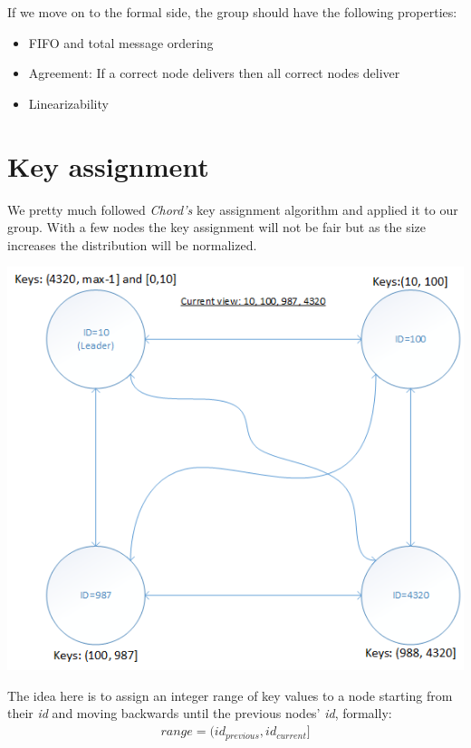 \documentclass[a4paper, 11pt]{article}
\begin{document}
\noindent If we move on to the formal side, the group should have the following properties\cite{chordy}\cite{groupy}:
\begin{itemize}
	\item FIFO and total message ordering
	\item Agreement: If a correct node delivers then all correct nodes deliver
	\item Linearizability
\end{itemize}

\clearpage

\section{Key assignment} \label{keys}

\noindent We pretty much followed \textit{Chord's} key assignment\cite{chordy} algorithm and applied it to our group. With a few nodes the key assignment will not be fair but as the size increases the distribution will be normalized.

{\centering\includegraphics[scale = 0.7]{./figures/key-assignment.png}\par}

\noindent The idea here is to assign an integer range of key values to a node starting from their \textit{id} and moving  backwards until the previous nodes' \textit{id}, formally:
\begin{gather*}
range = (id_{previous}, id_{current}]
\end{gather*}
\end{document}
